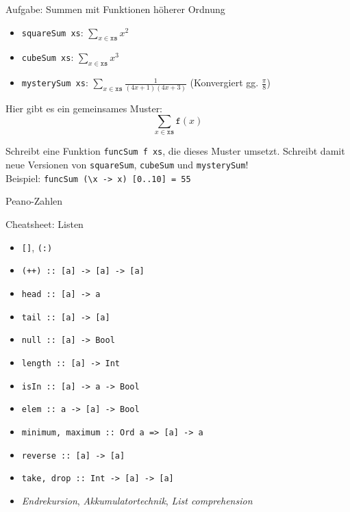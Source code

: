 \documentclass{beamer}
\begin{document}
\begin{frame}{Aufgabe: Summen mit Funktionen höherer Ordnung}
  \begin{itemize}
    \item \texttt{squareSum xs}: $\sum\limits_{x \in \texttt{xs}} x^2$
    \item \texttt{cubeSum xs}: $\sum\limits_{x \in \texttt{xs}} x^3$
    \item \texttt{mysterySum xs}: $\sum\limits_{x \in \texttt{xs}} \frac{1}{(4x + 1)(4x + 3)}$ (Konvergiert gg. $\frac{\pi}{8}$)
  \end{itemize}

  Hier gibt es ein gemeinsames Muster:
  \pause
  $$
  \sum\limits_{x \in \texttt{xs}} \texttt{f}(x)
  $$

  Schreibt eine Funktion \texttt{funcSum f xs}, die dieses Muster umsetzt. Schreibt damit neue Versionen von \texttt{squareSum}, \texttt{cubeSum} und \texttt{mysterySum}!\\
  Beispiel: \texttt{funcSum (\textbackslash{}x -> x) [0..10] = 55}
\end{frame}

\begin{frame}{Peano-Zahlen}
\end{frame}

\begin{frame}{Cheatsheet: Listen}
        \begin{itemize}
          \item \texttt{[]}, \texttt{(:)}
          \item \texttt{(++) :: [a] -> [a] -> [a]}
          \item \texttt{head :: [a] -> a}
          \item \texttt{tail :: [a] -> [a]}
          \item \texttt{null :: [a] -> Bool}
          \item \texttt{length :: [a] -> Int}
          \item \texttt{isIn :: [a] -> a -> Bool}
          \item \texttt{elem :: a -> [a] -> Bool}
          \item \texttt{minimum, maximum :: Ord a => [a] -> a}
          \item \texttt{reverse :: [a] -> [a]}
          \item \texttt{take, drop :: Int -> [a] -> [a]}
          \item \emph{Endrekursion}, \emph{Akkumulatortechnik}, \emph{List comprehension}
        \end{itemize}
\end{frame}
\end{document}
